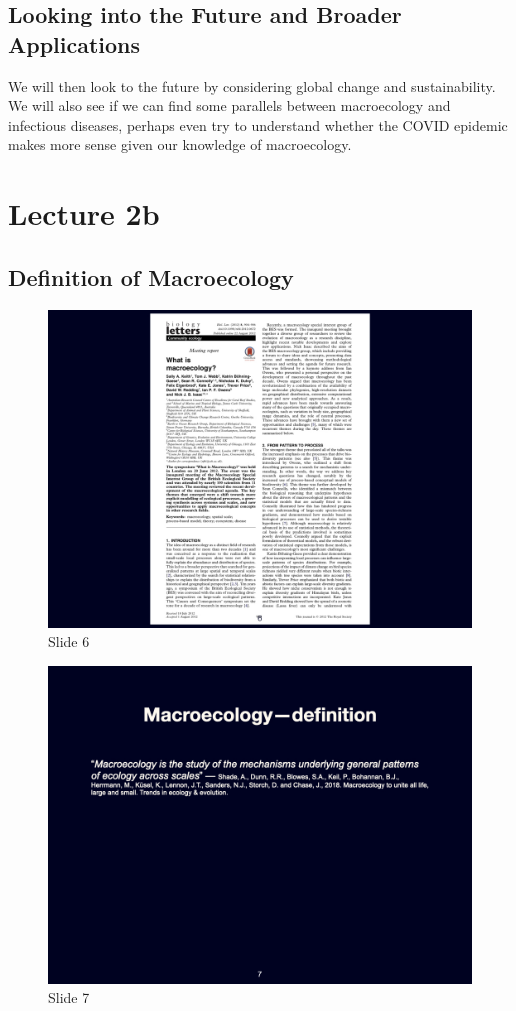 \documentclass[
  11pt,
]{book}
\begin{document}
\section{Looking into the Future and Broader
Applications}\label{looking-into-the-future-and-broader-applications}

We will then look to the future by considering global change and
sustainability. We will also see if we can find some parallels between
macroecology and infectious diseases, perhaps even try to understand
whether the COVID epidemic makes more sense given our knowledge of
macroecology.

\chapter*{Lecture 2b}\label{lecture-2b}

\section{Definition of Macroecology}\label{definition-of-macroecology}

\begin{figure}[ht]
\centering
\includegraphics[width=0.8\linewidth]{../images/BDC334/BDC334-006.jpeg}
\caption*{Slide 6}
\end{figure}

\begin{figure}[ht]
\centering
\includegraphics[width=0.8\linewidth]{../images/BDC334/BDC334-007.jpeg}
\caption*{Slide 7}
\end{figure}
\end{document}
